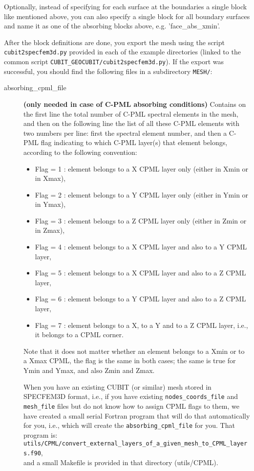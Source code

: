 Optionally, instead of specifying for each surface at the boundaries
a single block like mentioned above, you can also specify a single
block for all boundary surfaces and name it as one of the absorbing
blocks above, e.g. 'face\_abs\_xmin'.

After the block definitions are done, you export the mesh using the
script \texttt{cubit2specfem3d.py} provided in each of the example
directories (linked to the common script \texttt{CUBIT\_GEOCUBIT/cubit2specfem3d.py}).
If the export was successful, you should find the following
files in a subdirectory \texttt{MESH/}:
\begin{description}
\item [{absorbing\_cpml\_file}] \textbf{(only needed in case of C-PML absorbing
conditions)} Contains on the first line the total number of C-PML
spectral elements in the mesh, and then on the following line the
list of all these C-PML elements with two numbers per line: first
the spectral element number, and then a C-PML flag indicating to which
C-PML layer(s) that element belongs, according to the following convention:

\begin{itemize}
\item Flag = 1 : element belongs to a X CPML layer only (either in Xmin or in Xmax),
\item Flag = 2 : element belongs to a Y CPML layer only (either in Ymin or in Ymax),
\item Flag = 3 : element belongs to a Z CPML layer only (either in Zmin or in Zmax),
\item Flag = 4 : element belongs to a X CPML layer and also to a Y CPML layer,
\item Flag = 5 : element belongs to a X CPML layer and also to a Z CPML layer,
\item Flag = 6 : element belongs to a Y CPML layer and also to a Z CPML layer,
\item Flag = 7 : element belongs to a X, to a Y and to a Z CPML layer, i.e., it belongs to a CPML corner.
\end{itemize}

Note that it does not matter whether an element belongs to a Xmin
or to a Xmax CPML, the flag is the same in both cases; the same is
true for Ymin and Ymax, and also Zmin and Zmax.


When you have an existing CUBIT (or similar) mesh stored in SPECFEM3D
format, i.e., if you have existing \texttt{nodes\_coords\_file}
and \texttt{mesh\_file} files but do not know
how to assign CPML flags to them, we have created a small serial Fortran
program that will do that automatically for you, i.e., which will
create the \texttt{absorbing\_cpml\_file} for
you. That program is: \\
\texttt{utils/CPML/convert\_external\_layers\_of\_a\_given\_mesh\_to\_CPML\_layers.f90},\\
and a small Makefile is provided in that directory (utils/CPML).



\end{description}
